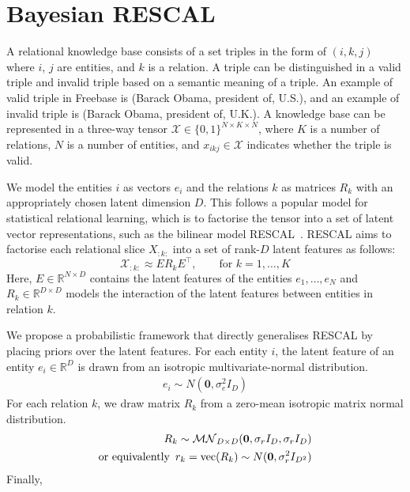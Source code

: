 \section{Bayesian RESCAL}
A relational knowledge base consists of a set triples in the form of $(i, k, j)$
where $i$, $j$ are entities, and $k$ is a relation. A triple can be distinguished
in a valid triple and invalid triple based on a semantic meaning of a triple. An
example of valid triple in Freebase is (Barack Obama, president of, U.S.), and an
example of invalid triple is (Barack Obama, president of, U.K.).
A knowledge base can be represented in a three-way tensor
$\mathcal{X} \in \{0, 1\}^{N \times K \times N}$, where $K$ is a number of
relations, $N$ is a number of entities, and $x_{ikj}\in\mathcal{X}$ indicates whether
the triple is valid.

We model the entities $i$ as vectors $e_i$ and the relations $k$ as matrices $R_k$ with an
appropriately chosen latent dimension $D$. This follows a popular model
for statistical relational learning, which is to factorise the tensor into a
set of latent vector representations, such as the bilinear model RESCAL~\cite{nickel2011three}.
RESCAL aims to factorise each relational slice $X_{:k:}$ into a set of rank-$D$ latent
features as follows:
\[
  \mathcal{X}_{:k:} \approx E R_k E^\top, \qquad \text{for } k = 1, \dots, K
\]
Here, $E\in {\mathbb R}^{N \times D}$ contains the latent features of the
entities $e_1, \ldots, e_N$ and $R_k\in {\mathbb R}^{D \times D}$ models the interaction of the
latent features between entities in relation $k$.

We propose a probabilistic framework that directly generalises RESCAL
by placing priors over the
latent features. For each entity $i$, the latent feature of an entity $e_i \in
\mathbb{R}^{D}$ is drawn from an isotropic multivariate-normal distribution.
\begin{align}
\label{eqn:entity_gen}
e_i \sim {N}(\mathbf{0}, \sigma_e^2{I}_D)
\end{align}
For each relation $k$, we draw matrix $R_k$ from
a zero-mean isotropic matrix normal distribution.
\begin{align}
\label{eqn:relation_gen}
R_k \sim \mathcal{MN}_{D \times D}(\mathbf{0}, \sigma_r{I}_D, \sigma_r{I}_D) \\
\text{or equivalently}\enspace r_k  = \text{vec}(R_k) \sim N(\mathbf{0}, \sigma_r^2 I_{D^2}) \notag
\end{align} %
Finally,

